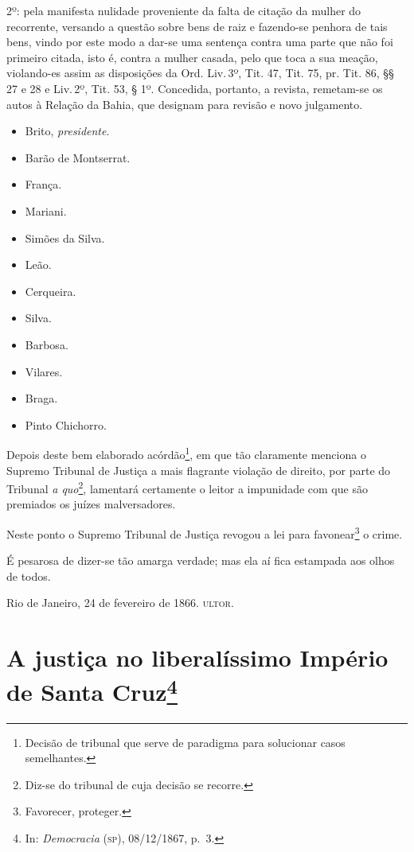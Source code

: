 2º: pela manifesta nulidade proveniente da falta de citação da mulher do
recorrente, versando a questão sobre bens de raiz e fazendo-se penhora
de tais bens, vindo por este modo a dar-se uma sentença contra uma parte
que não foi primeiro citada, isto é, contra a mulher casada, pelo que
toca a sua meação, violando-es assim as disposições da Ord. Liv.\,3º,
Tit. 47, Tit. 75, pr. Tit. 86, §§ 27 e 28 e Liv.\,2º, Tit. 53, § 1º.
Concedida, portanto, a revista, remetam-se os autos à Relação da Bahia,
que designam para revisão e novo julgamento.


\begin{itemize}
\tightlist
\item
  Brito, \emph{presidente}.
\item
  Barão de Montserrat.
\item
  França.
\item
  Mariani.
\item
  Simões da Silva.
\item
  Leão.
\item
  Cerqueira.
\item
  Silva.
\item
  Barbosa.
\item
  Vilares.
\item
  Braga.
\item
  Pinto Chichorro.
\end{itemize}

Depois deste bem elaborado acórdão\footnote{Decisão de tribunal que
  serve de paradigma para solucionar casos semelhantes.}, em que tão
claramente menciona o Supremo Tribunal de Justiça a mais flagrante
violação de direito, por parte do Tribunal \emph{a quo}\footnote{
  Diz-se do tribunal de cuja decisão se recorre.}, lamentará certamente
o leitor a impunidade com que são premiados os juízes malversadores.

Neste ponto o Supremo Tribunal de Justiça revogou a lei para
favonear\footnote{Favorecer, proteger.} o crime.

É pesarosa de dizer-se tão amarga verdade; mas ela aí fica estampada aos
olhos de todos.
\begin{flushright}
Rio de Janeiro, 24 de fevereiro de 1866.
\textsc{ultor}.
\end{flushright}
\chapter{A justiça no liberalíssimo Império de Santa Cruz\footnote{In:
  \emph{Democracia} (\textsc{sp}), 08/12/1867, p.~3.}}

